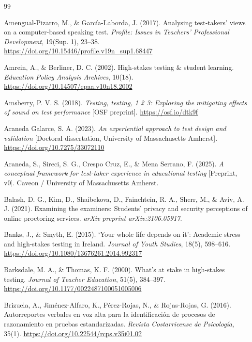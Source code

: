 \documentclass[11pt]{article}
\begin{document}

\begin{thebibliography}{99}

Amengual-Pizarro, M., \& Garc\'ia-Laborda, J. (2017). Analysing test-takers' views on a computer-based speaking test. \textit{Profile: Issues in Teachers' Professional Development}, 19(Sup. 1), 23--38. \url{https://doi.org/10.15446/profile.v19n_sup1.68447}

Amrein, A., \& Berliner, D. C. (2002). High-stakes testing \& student learning. \textit{Education Policy Analysis Archives}, 10(18). \url{https://doi.org/10.14507/epaa.v10n18.2002}

Amsberry, P. V. S. (2018). \textit{Testing, testing, 1 2 3: Exploring the mitigating effects of sound on test performance} [OSF preprint]. \url{https://osf.io/dtk9f}

Araneda Galarce, S. A. (2023). \textit{An experiential approach to test design and validation} [Doctoral dissertation, University of Massachusetts Amherst]. \url{https://doi.org/10.7275/33072110}

Araneda, S., Sireci, S. G., Crespo Cruz, E., \& Mena Serrano, F. (2025). \textit{A conceptual framework for test-taker experience in educational testing} [Preprint, v0]. Caveon / University of Massachusetts Amherst.

Balash, D. G., Kim, D., Shaibekova, D., Fainchtein, R. A., Sherr, M., \& Aviv, A. J. (2021). Examining the examiners: Students' privacy and security perceptions of online proctoring services. \textit{arXiv preprint arXiv:2106.05917}.

Banks, J., \& Smyth, E. (2015). `Your whole life depends on it': Academic stress and high-stakes testing in Ireland. \textit{Journal of Youth Studies}, 18(5), 598--616. \url{https://doi.org/10.1080/13676261.2014.992317}

Barksdale, M. A., \& Thomas, K. F. (2000). What's at stake in high-stakes testing. \textit{Journal of Teacher Education}, 51(5), 384--397. \url{https://doi.org/10.1177/0022487100051005006}

Brizuela, A., Jim\'enez-Alfaro, K., P\'erez-Rojas, N., \& Rojas-Rojas, G. (2016). Autorreportes verbales en voz alta para la identificaci\'on de procesos de razonamiento en pruebas estandarizadas. \textit{Revista Costarricense de Psicolog\'ia}, 35(1). \url{https://doi.org/10.22544/rcps.v35i01.02}


\end{thebibliography}
\end{document}
